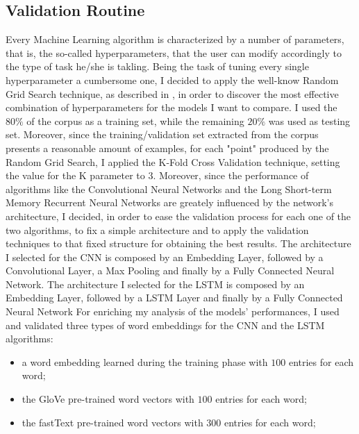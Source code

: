 \documentclass[11pt,twocolumn]{article}
\begin{document}
        \subsection{Validation Routine} %
        \label{sub:validation_routine}
            Every Machine Learning algorithm is characterized by a number of parameters, that is, the
            so-called hyperparameters, that the user can modify accordingly to the type of task he/she is
            takling. Being the task of tuning every single hyperparameter a cumbersome one, I decided to
            apply the well-know Random Grid Search technique, as described in \cite{random_grid_search}, in
            order to discover the most effective combination of hyperparameters for the models I want to
            compare. I used the $80\%$ of the corpus as a training set, while the remaining $20\%$ was used as
            testing set. Moreover, since the training/validation set extracted from the corpus
            presents a reasonable amount of examples, for each "point" produced by the Random Grid Search, I
            applied the K-Fold Cross Validation technique, setting the value for the K parameter to $3$.
            Moreover, since the performance of algorithms like the Convolutional Neural Networks and the
            Long Short-term Memory Recurrent Neural Networks are greately influenced by the network's
            architecture, I decided, in order to ease the validation process for each one of the two
            algorithms, to fix a simple architecture and to apply the validation techniques to that fixed
            structure for obtaining the best results. The architecture I selected for the CNN is composed
            by an Embedding Layer, followed by a Convolutional Layer, a Max Pooling and finally by a Fully
            Connected Neural Network. The architecture I selected for the LSTM is composed by an Embedding
            Layer, followed by a LSTM Layer and finally by a Fully Connected Neural Network For enriching
            my analysis of the models' performances, I used and validated three types of word embeddings
            for the CNN and the LSTM algorithms:

            \begin{itemize}
                \item a word embedding learned during the training phase with $100$ entries for each word;
                \item the GloVe \cite{glove} pre-trained word vectors with $100$ entries for each word;
                \item the fastText \cite{fasttext} pre-trained word vectors with $300$ entries for each
                word;
            \end{itemize}
\end{document}
